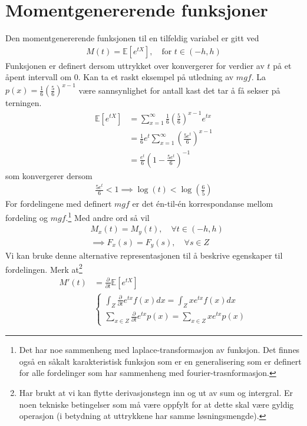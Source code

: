 \section{Momentgenererende funksjoner}
Den momentgenererende funksjonen til en tilfeldig variabel er gitt ved
\begin{align}
M(t) = \mathbb{E}[e^{tX}], \quad \text{for } t \in (-h,h)
\end{align}
Funksjonen er definert dersom uttrykket over konvergerer for verdier av $t$ på et åpent intervall om $0$. Kan ta et raskt eksempel på utledning av $mgf$. La $p(x) = \frac{1}{6}\left(\frac{5}{6}\right)^{x-1}$ være sannsynlighet for antall kast det tar å få sekser på terningen.
\begin{align}
\mathbb{E}[e^{tX}] &=\sum_{x=1}^{\infty} \frac{1}{6}\left(\frac{5}{6}\right)^{x-1} e^{tx}\\
&=\frac{1}{6}e^t \sum_{x=1}^{\infty} \left(\frac{5e^t}{6}\right)^{x-1} \\
&=\frac{e^t}{6}\left(1-\frac{5e^t}{6}\right)^{-1}
\end{align}
som konvergerer dersom 
\begin{align}
\frac{5e^t}{6} < 1 \implies \log(t)<\log\left(\frac{6}{5}\right)
\end{align}
For fordelingene med definert $mgf$ er det én-til-én korrespondanse mellom fordeling og $mgf$.\footnote{Det har noe sammenheng med laplace-transformasjon av funksjon. Det finnes også en såkalt karakteristisk funksjon som er en generalisering som er definert for alle fordelinger som har sammenheng med fourier-trasnformasjon.} Med andre ord så vil 
\begin{align}
&M_x(t) = M_y(t), \quad \forall t \in (-h,h) \\
&\implies F_x(s)=F_y(s), \quad \forall s \in Z
\end{align}
Vi kan bruke denne alternative representasjonen til å beskrive egenskaper til fordelingen. Merk at\footnote{Har brukt at vi kan flytte derivasjonstegn inn og ut av sum og intergral. Er noen tekniske betingelser som må være oppfylt for at dette skal være gyldig operasjon (i betydning at uttrykkene har samme løsningsmengde).}
\begin{align}
M'(t) &= \frac{\partial}{\partial t} \mathbb{E}[e^{tX}]\\
&\begin{cases}
\int_Z \frac{\partial}{\partial t} e^{tx}f(x)dx = \int_Z x e^{tx}f(x)dx\\
\sum_{x\in Z}\frac{\partial}{\partial t} e^{tx}p(x) = \sum_{x\in Z}x e^{tx}p(x)
\end{cases}
\end{align}
